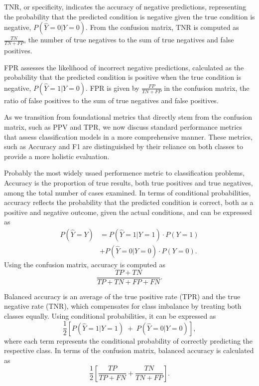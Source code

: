 \begin{definition}\label{def:tnr}
TNR, or specificity, indicates the accuracy of negative predictions, representing the probability that the predicted condition is negative given the true condition is negative, $P(\hat{Y}=0|Y=0)$. From the confusion matrix, TNR is computed as $\frac{TN}{TN + FP}$, the number of true negatives to the sum of true negatives and false positives.
\end{definition}

\begin{definition}\label{def:fpr}
FPR assesses the likelihood of incorrect negative predictions, calculated as the probability that the predicted condition is positive when the true condition is negative, $P(\hat{Y}=1|Y=0)$. FPR is given by $\frac{FP}{TN + FP}$ in the confusion matrix, the ratio of false positives to the sum of true negatives and false positives.
\end{definition}

As we transition from foundational metrics that directly stem from the confusion matrix, such as PPV and TPR, we now discuss standard performance metrics that assess classification models in a more comprehensive manner. These metrics, such as Accuracy and F1 are distinguished by their reliance on both classes to provide a more holistic evaluation.

\begin{definition}\label{def:acc}
Probably the most widely usaed performence metric to classification problems, Accuracy is the proportion of true results, both true positives and true negatives, among the total number of cases examined. In terms of conditional probabilities, accuracy reflects the probability that the predicted condition is correct, both as a positive and negative outcome, given the actual conditions, and can be 
expressed as 
\begin{align*}
    P(\hat{Y}=Y) &= P(\hat{Y}=1|Y=1) \cdot P(Y=1) \\
    &+ P(\hat{Y}=0|Y=0) \cdot P(Y=0).
\end{align*}
Using the confusion matrix, accuracy is computed as $$\frac{TP + TN}{TP + TN + FP + FN}.$$
\end{definition}
    
\begin{definition}\label{def:ba}
Balanced accuracy is an average of the true positive rate (TPR) and the true negative rate (TNR), which compensates for class imbalance by treating both classes equally. Using conditional probabilities, it can be expressed as $$\frac{1}{2}\left[ P(\hat{Y}=1|Y=1) \; + \; P(\hat{Y}=0|Y=0)\right],$$ where each term represents the conditional probability of correctly predicting the respective class. In terms of the confusion matrix, balanced accuracy is calculated as $$\frac{1}{2}\left[\frac{TP}{TP + FN} + \frac{TN}{TN + FP}\right].$$
\end{definition}
    
